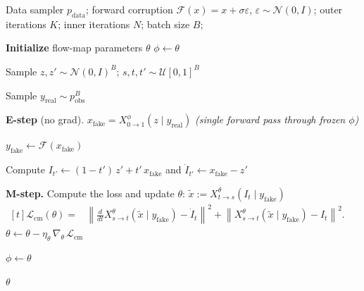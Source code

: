 \documentclass{article}
\newcommand{\Xmap}[3]{X^{#1}_{#2 \to #3}}   %
\newcommand{\Fcorr}{\mathcal{F}}              %
\newcommand{\Lcm}{\mathcal{L}_{\mathrm{cm}}}
\newcommand{\yreal}{y_{\mathrm{real}}}
\newcommand{\yfake}{y_{\mathrm{fake}}}
\newcommand{\xfake}{x_{\mathrm{fake}}}
\begin{document}
\begin{algorithm}
\caption{Lifted SCSI EM with Conditional Flow Map Parameterization}
\label{alg:lifted-cm}
\begin{algorithmic}[1]
\Require
  Data sampler $p_{\mathrm{data}}$;\;
  forward corruption $\Fcorr(x) = x + \sigma\varepsilon$, $\varepsilon\sim\mathcal{N}(0,I)$;
  outer iterations $K$;\; inner iterations $N$;\;
  batch size $B$;\;

\State \textbf{Initialize} flow-map parameters $\theta$
\State $\phi \leftarrow \theta$ 

 
   

    \State Sample $z, z' \sim \mathcal{N}(0,I)^{B}$;\;
           $s,t,t' \sim \mathcal{U}[0,1]^{B}$

    \State Sample $\yreal \sim p_{\mathrm{obs}}^{B}$
    \Statex

    \State \textbf{E-step} (no grad).
    \State \quad $\xfake = \Xmap{\phi}{0}{1}(z \mid \yreal)$
           \hfill\textit{(single forward pass through frozen $\phi$)}

    \State \quad $\yfake \leftarrow \Fcorr(\xfake)$

    \State \quad Compute $I_{t'} \leftarrow (1 - t')\,z' + t'\,\xfake$ and $\dot I_{t'} \leftarrow \xfake - z'$
           
    \Statex
    \State \textbf{M-step.} Compute the loss and update $\theta$:
    \State \quad $\tilde{x} := \Xmap{\theta}{t}{s}(I_{t} \mid \yfake)$
    \State \quad $\begin{aligned}[t]
      \Lcm(\theta) ={}& \left\|
        \frac{d}{dt}\Xmap{\theta}{s}{t}(\tilde{x} \mid \yfake) - \dot I_{t}
      \right\|^{2} + \left\|
        \Xmap{\theta}{s}{t}(\tilde{x} \mid \yfake) - I_{t}
      \right\|^{2}.
    \end{aligned}$
    \State \quad $\theta \leftarrow \theta - \eta_{\theta}\,\nabla_{\theta}\,\Lcm$

  \EndFor
  \State $\phi \leftarrow \theta$
\EndFor

\State \Return $\theta$ 
\end{algorithmic}
\end{algorithm}
\end{document}
